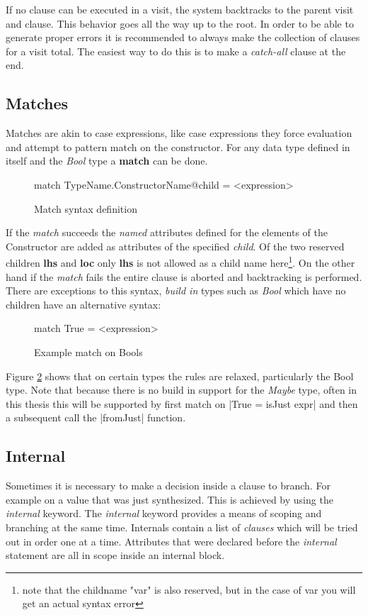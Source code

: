 If no clause can be executed in a visit, the system backtracks to the parent visit and clause. This behavior goes all the way up to the root. In order to be able to generate proper errors it is recommended to always make the collection of clauses for a visit total. The easiest way to do this is to make a \emph{catch-all} clause at the end.

\subsection{Matches}
Matches are akin to case expressions, like case expressions they force evaluation and attempt to pattern match on the constructor. For any data type defined in \rcore itself and the \emph{Bool} type a \textbf{match} can be done.

\begin{figure}[h!]
\begin{code}
match TypeName.ConstructorName@child  = <expression>
\end{code}
\caption{Match syntax definition}
\label{match:syntax}
\end{figure}

If the \emph{match} succeeds the \emph{named} attributes defined for the elements of the Constructor are added as attributes of the specified \emph{child}. Of the two reserved children \textbf{lhs} and \textbf{loc} only \textbf{lhs} is not allowed as a child name here\footnote{note that the childname "var" is also reserved, but in the case of var you will get an actual syntax error}. On the other hand if the \emph{match} fails the entire clause is aborted and backtracking is performed.
There are exceptions to this syntax, \emph{build in} types such as \emph{Bool} which have no children have an alternative syntax:

\begin{figure}[h!]
\begin{code}
match True = <expression>
\end{code}
\caption{Example match on Bools}
\label{match:bool}
\end{figure}

Figure \ref{match:bool} shows that on certain types the rules are relaxed, particularly the Bool type. Note that because there is no build in support for the \emph{Maybe} type, often in this thesis this will be supported by first match on |True = isJust expr| and then a subsequent call the |fromJust| function.

\subsection{Internal}
Sometimes it is necessary to make a decision inside a clause to branch. For example on a value that was just synthesized. This is achieved by using the \emph{internal} keyword. The \emph{internal} keyword provides a means of scoping and branching at the same time. Internals contain a list of \emph{clauses} which will be tried out in order one at a time. Attributes that were declared before the \emph{internal} statement are all in scope inside an internal block. 

